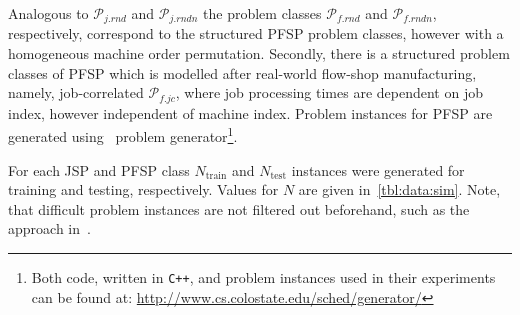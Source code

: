 \documentclass{acm_proc_article-sp}
\begin{document}
Analogous to $\mathcal{P}_{j.rnd}$ and $\mathcal{P}_{j.rndn}$ the problem classes $\mathcal{P}_{f.rnd}$ and $\mathcal{P}_{f.rndn}$, respectively, correspond to the structured PFSP problem classes, however with a homogeneous machine order permutation.  
Secondly, there is a structured problem classes of PFSP which is modelled after real-world flow-shop manufacturing, namely, job-correlated $\mathcal{P}_{f.jc}$, where job processing times are dependent on job index, however independent of machine index.
Problem instances for PFSP are generated using~\cite{Whitley} problem generator\footnote{Both code, written in \texttt{C++}, and problem instances used in their experiments can be found at: \url{http://www.cs.colostate.edu/sched/generator/}}. 

For each JSP and PFSP class $N_{\text{train}}$  and $N_{\text{test}}$ instances were generated for training and testing, respectively. Values for $N$ are given in~\cref{tbl:data:sim}. Note, that difficult problem instances are not filtered out beforehand, such as the approach in~\cite{Whitley}. 
\end{document}
